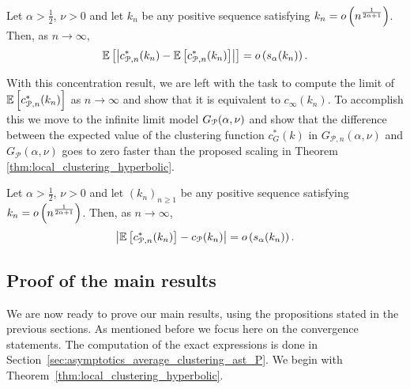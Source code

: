 \begin{proposition}\label{prop:concentration_local_clustering_P_n}
Let $\alpha > \frac{1}{2}$, $\nu > 0$ and let $k_n$ be any positive sequence satisfying $k_n = o\left(n^{\frac{1}{2\alpha+1}}\right)$. Then, as $n \to \infty$,
\[
	\mathbb{E}\left[\left|c_{\mathcal{P},n}^\ast(k_n) - \mathbb{E}\left[c_{\mathcal{P},n}^\ast(k_n)\right]\right|\right] = o\left(s_\alpha(k_n)\right).
\]
\end{proposition}

With this concentration result, we are left with the task to compute the limit of $\mathbb{E}\left[c_{\mathcal{P},n}^\ast(k_n)\right]$ as $n \to \infty$ and show that it is equivalent to $c_\infty(k_n)$. To accomplish this we move to the infinite limit model $G_{{\mathcal P}}(\alpha,\nu)$ and show that the difference between the expected value of the clustering function $c_G^\ast(k)$ in $G_{\mathcal{P},n}(\alpha,\nu)$ and $G_{\mathcal{P}}(\alpha,\nu)$ goes to zero faster than the proposed scaling in Theorem \ref{thm:local_clustering_hyperbolic}.


\begin{proposition}\label{prop:convergence_average_clustering_P_n}
Let $\alpha > \frac{1}{2}$, $\nu > 0$ and let $(k_n)_{n \ge 1}$ be any positive sequence satisfying $k_n = o\left(n^{\frac{1}{2\alpha+1}}\right)$. Then, as $n \to \infty$,
\[
	\left|\mathbb{E}\left[c_{{\mathcal P},n}^\ast(k_n)\right] - c_{{\mathcal P}}(k_n)\right| = o\left(s_\alpha(k_n)\right).
\]
\end{proposition}

\subsection{Proof of the main results}\label{ssec:proof_main_results}

We are now ready to prove our main results, using the propositions stated in the previous sections. As mentioned before we focus here on the convergence statements. The computation of the exact expressions is done in Section~\ref{sec:asymptotics_average_clustering_ast_P}. We begin with Theorem~\ref{thm:local_clustering_hyperbolic}.

